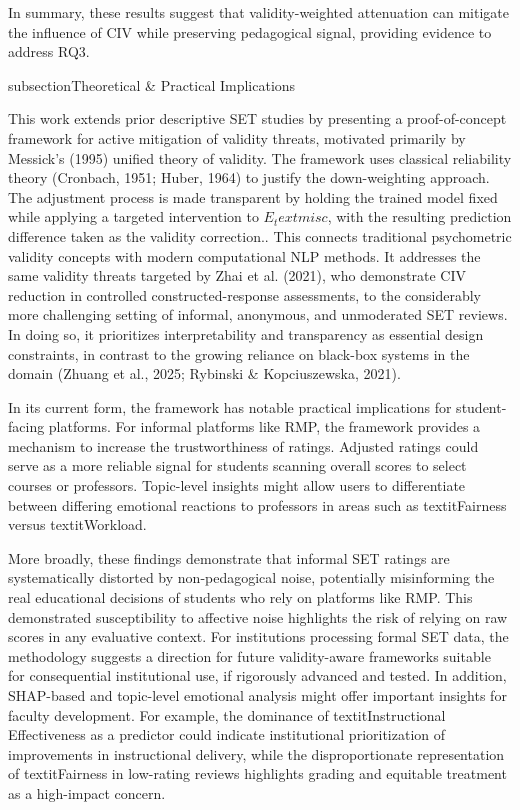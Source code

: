 In summary, these results suggest that validity-weighted attenuation can mitigate the influence of CIV while preserving pedagogical signal, providing evidence to address RQ3.

subsection{Theoretical & Practical Implications}

This work extends prior descriptive SET studies by presenting a proof-of-concept framework for active mitigation of validity threats, motivated primarily by Messick's (1995) unified theory of validity. The framework uses classical reliability theory (Cronbach, 1951; Huber, 1964) to justify the down-weighting approach. The adjustment process is made transparent by holding the trained model fixed while applying a targeted intervention to $E_text{misc}$, with the resulting prediction difference taken as the validity correction.. This connects traditional psychometric validity concepts with modern computational NLP methods. It addresses the same validity threats targeted by Zhai et al. (2021), who demonstrate CIV reduction in controlled constructed-response assessments, to the considerably more challenging setting of informal, anonymous, and unmoderated SET reviews. In doing so, it prioritizes interpretability and transparency as essential design constraints, in contrast to the growing reliance on black-box systems in the domain (Zhuang et al., 2025; Rybinski & Kopciuszewska, 2021).

In its current form, the framework has notable practical implications for student-facing platforms. For informal platforms like RMP, the framework provides a mechanism to increase the trustworthiness of ratings. Adjusted ratings could serve as a more reliable signal for students scanning overall scores to select courses or professors. Topic-level insights might allow users to differentiate between differing emotional reactions to professors in areas such as textit{Fairness} versus textit{Workload}.

More broadly, these findings demonstrate that informal SET ratings are systematically distorted by non-pedagogical noise, potentially misinforming the real educational decisions of students who rely on platforms like RMP. This demonstrated susceptibility to affective noise highlights the risk of relying on raw scores in any evaluative context. For institutions processing formal SET data, the methodology suggests a direction for future validity-aware frameworks suitable for consequential institutional use, if rigorously advanced and tested. In addition, SHAP-based and topic-level emotional analysis might offer important insights for faculty development. For example, the dominance of textit{Instructional Effectiveness} as a predictor could indicate institutional prioritization of improvements in instructional delivery, while the disproportionate representation of textit{Fairness} in low-rating reviews highlights grading and equitable treatment as a high-impact concern.

